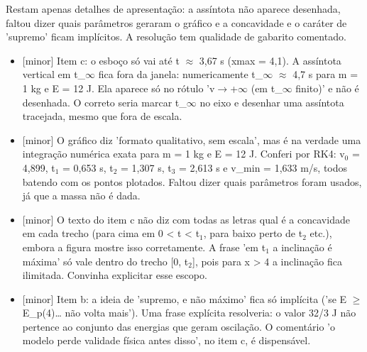 \documentclass{article}%
\begin{document}
Restam apenas detalhes de apresentação: a assíntota não aparece desenhada, faltou dizer quais parâmetros geraram o gráfico e a concavidade e o caráter de 'supremo' ficam implícitos. A resolução tem qualidade de gabarito comentado.%
\begin{itemize}%
\item%
{[}minor{]} Item c: o esboço só vai até t $\approx$ 3,67 s (xmax = 4,1). A assíntota vertical em t\_$\infty$ fica fora da janela: numericamente t\_$\infty$ $\approx$ 4,7 s para m = 1 kg e E = 12 J. Ela aparece só no rótulo 'v$\to$+$\infty$ (em t\_$\infty$ finito)' e não é desenhada. O correto seria marcar t\_$\infty$ no eixo e desenhar uma assíntota tracejada, mesmo que fora de escala.%
\item%
{[}minor{]} O gráfico diz 'formato qualitativo, sem escala', mas é na verdade uma integração numérica exata para m = 1 kg e E = 12 J. Conferi por RK4: v$_{0}$ = 4,899, t$_{1}$ = 0,653 s, t$_{2}$ = 1,307 s, t$_{3}$ = 2,613 s e v\_min = 1,633 m/s, todos batendo com os pontos plotados. Faltou dizer quais parâmetros foram usados, já que a massa não é dada.%
\item%
{[}minor{]} O texto do item c não diz com todas as letras qual é a concavidade em cada trecho (para cima em 0 < t < t$_{1}$, para baixo perto de t$_{2}$ etc.), embora a figura mostre isso corretamente. A frase 'em t$_{1}$ a inclinação é máxima' só vale dentro do trecho {[}0, t$_{2}${]}, pois para x > 4 a inclinação fica ilimitada. Convinha explicitar esse escopo.%
\item%
{[}minor{]} Item b: a ideia de 'supremo, e não máximo' fica só implícita ('se E $\geq$ E\_p(4)\ldots{} não volta mais'). Uma frase explícita resolveria: o valor 32/3 J não pertence ao conjunto das energias que geram oscilação. O comentário 'o modelo perde validade física antes disso', no item c, é dispensável.%
\end{itemize}%
\end{document}

